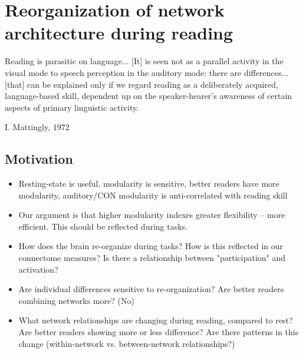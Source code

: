 \chapter{Reorganization of network architecture during reading}

\epigraph{Reading is parasitic on language... [It] is seen not as a parallel activity in the visual mode to speech perception in the auditory mode: there are differences... [that] can be explained only if we regard reading as a deliberately acquired, language-based skill, dependent up on the speaker-hearer's awareness of certain aspects of primary linguistic activity.}{I. Mattingly, 1972 \citep{Mattingly1971}}

\section{Motivation}

\begin{itemize}
	\item Resting-state is useful, modularity is sensitive, better readers have more modularity, auditory/CON modularity is anti-correlated with reading skill
	\item Our argument is that higher modularity indexes greater flexibility -- more efficient. This should be reflected during tasks.
	\item How does the brain re-organize during tasks? How is this reflected in our connectome measures? Is there a relationship between "participation" and activation?
	\item Are individual differences sensitive to re-organization? Are better readers combining networks more? (No)
	\item What network relationships are changing during reading, compared to rest? Are better readers showing more or less difference? Are there patterns in this change (within-network vs. between-network relationships?)

\end{itemize}

